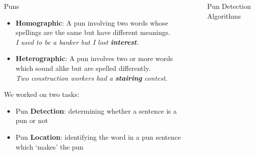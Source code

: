 \documentclass[final]{beamer}
\newlength{\sepwid}
\newlength{\onecolwid}
\newlength{\twocolwid}
\begin{document}
\begin{frame}[t]
\begin{columns}[t]
\begin{column}{\onecolwid}
\begin{block}{Puns}
{					\begin{itemize}
						\item {\textbf{Homographic}: A pun involving two words whose spellings are the same but have different meanings.\\
								\textit{I used to be a banker but I lost \textbf{interest}.}}
						\item {\textbf{Heterographic}: A pun involves two or more words which sound alike but are spelled differently.\\
								\textit{Two construction workers had a \textbf{stairing} contest.}}
					\end{itemize}
					\vspace{40mm}
					We worked on two tasks: 
					\begin{itemize}
						\item {Pun \textbf{Detection}: determining whether a sentence is a pun or not}
						\item {Pun \textbf{Location}: identifying the word in a pun sentence which `makes' the pun}
					\end{itemize}
				}
			\end{block}
		\end{column}
		\begin{column}{\sepwid}\end{column}
		\begin{column}{\twocolwid}
			\begin{columns}[t,totalwidth=\twocolwid] %
				\begin{column}{\onecolwid}\vspace{-.6in}
					\vspace{60mm}
					\begin{block}{Pun Detection Algorithms}
						{\large 
							\begin{itemize}

\end{itemize}}
\end{block}
\end{column}
\end{columns}
\end{column}
\end{columns}
\end{frame}
\end{document}
